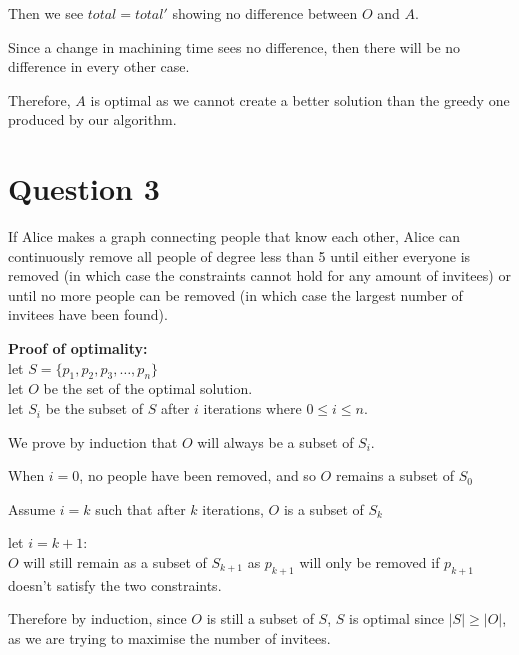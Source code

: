 \documentclass{article}
\begin{document}
Then we see $total = total'$ showing no difference between $O$ and $A$.

Since a change in machining time sees no difference, then there will be no difference in every other case.

Therefore, $A$ is optimal as we cannot create a better solution than the greedy one produced by our algorithm.

\section*{Question 3}
If Alice makes a graph connecting people that know each other, Alice can continuously remove all people of degree less than 5 until either everyone is removed (in which case the constraints cannot hold for any amount of invitees) or until no more people can be removed (in which case the largest number of invitees have been found).

\textbf{Proof of optimality:}\\
let $S = \{p_1, p_2, p_3, \ldots, p_n\}$\\
let $O$ be the set of the optimal solution.\\
let $S_i$ be the subset of $S$ after $i$ iterations where $0 \leq i \leq n$.

We prove by induction that $O$ will always be a subset of $S_i$.

When $i = 0$, no people have been removed, and so $O$ remains a subset of $S_0$

Assume $i = k$ such that after $k$ iterations, $O$ is a subset of $S_k$

let $i = k + 1$:\\
$O$ will still remain as a subset of $S_{k+1}$ as $p_{k+1}$ will only be removed if $p_{k+1}$ doesn't satisfy the two constraints.

Therefore by induction, since $O$ is still a subset of $S$, $S$ is optimal since $|S| \geq |O|$, as we are trying to maximise the number of invitees.
\end{document}
